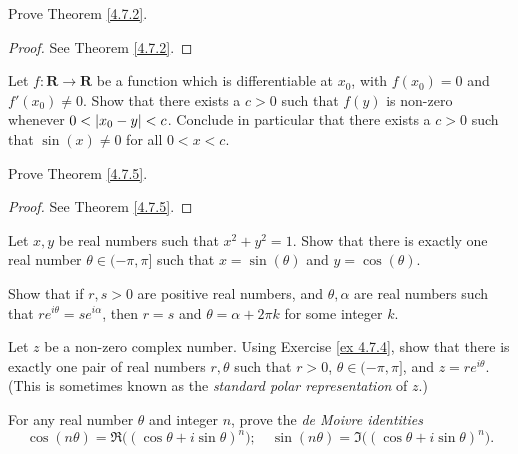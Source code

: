 \exercisesection

\begin{exercise}\label{ex 4.7.1}
    Prove Theorem \ref{4.7.2}.
\end{exercise}

\begin{proof}
    See Theorem \ref{4.7.2}.
\end{proof}

\begin{exercise}\label{ex 4.7.2}
    Let \(f : \mathbf{R} \to \mathbf{R}\) be a function which is differentiable at \(x_0\), with \(f(x_0) = 0\) and \(f'(x_0) \neq 0\).
    Show that there exists a \(c > 0\) such that \(f(y)\) is non-zero whenever \(0 < \abs*{x_0 - y} < c\).
    Conclude in particular that there exists a \(c > 0\) such that \(\sin(x) \neq 0\) for all \(0 < x < c\).
\end{exercise}

\begin{exercise}\label{ex 4.7.3}
    Prove Theorem \ref{4.7.5}.
\end{exercise}

\begin{proof}
    See Theorem \ref{4.7.5}.
\end{proof}

\begin{exercise}\label{ex 4.7.4}
    Let \(x, y\) be real numbers such that \(x^2 + y^2 = 1\).
    Show that there is exactly one real number \(\theta \in (-\pi, \pi]\) such that \(x = \sin(\theta)\) and \(y = \cos(\theta)\).
\end{exercise}

\begin{exercise}\label{ex 4.7.5}
    Show that if \(r, s > 0\) are positive real numbers, and \(\theta, \alpha\) are real numbers such that \(r e^{i \theta} = s e^{i \alpha}\), then \(r = s\) and \(\theta = \alpha + 2 \pi k\) for some integer \(k\).
\end{exercise}

\begin{exercise}\label{ex 4.7.6}
    Let \(z\) be a non-zero complex number.
    Using Exercise \ref{ex 4.7.4}, show that there is exactly one pair of real numbers \(r, \theta\) such that \(r > 0\), \(\theta \in (-\pi, \pi]\), and \(z = r e^{i \theta}\).
    (This is sometimes known as the \emph{standard polar representation} of \(z\).)
\end{exercise}

\begin{exercise}\label{ex 4.7.7}
    For any real number \(\theta\) and integer \(n\), prove the \emph{de Moivre identities}
    \[
        \cos(n \theta) = \Re\big((\cos \theta + i \sin \theta)^n\big); \quad \sin(n \theta) = \Im\big((\cos \theta + i \sin \theta)^n\big).
    \]
\end{exercise}

